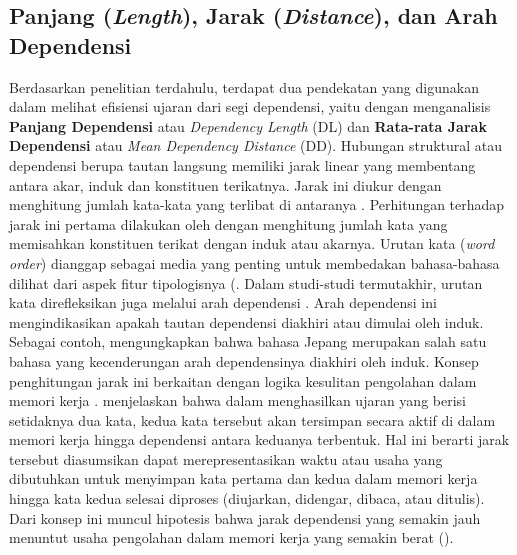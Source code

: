 \subsection{Panjang (\textit{Length}), Jarak (\textit{Distance}), dan Arah Dependensi}

Berdasarkan penelitian terdahulu, terdapat dua pendekatan yang digunakan dalam melihat efisiensi ujaran dari segi dependensi, yaitu dengan menganalisis \textbf{Panjang Dependensi} atau \textit{Dependency Length} (DL) dan \textbf{Rata-rata Jarak Dependensi} atau \textit{Mean Dependency Distance} (DD).  Hubungan struktural atau dependensi berupa tautan langsung memiliki jarak linear yang membentang antara akar, induk dan konstituen terikatnya. Jarak ini diukur dengan menghitung jumlah kata-kata yang terlibat di antaranya \citep{heringer1980syntax}. Perhitungan terhadap jarak ini pertama dilakukan oleh \cite{heringer1980syntax} dengan menghitung jumlah kata yang memisahkan konstituen terikat dengan induk atau akarnya. Urutan kata (\textit{word order}) dianggap sebagai media yang penting untuk membedakan bahasa-bahasa dilihat dari aspek fitur tipologisnya (\citealp{greenberg1963some, dryer1992greenbergian}. Dalam studi-studi termutakhir, urutan kata direfleksikan juga melalui arah dependensi \citep{hudson2007language}. Arah dependensi ini mengindikasikan apakah tautan dependensi diakhiri atau dimulai oleh induk. Sebagai contoh, \cite{hudson2003psychological} mengungkapkan bahwa bahasa Jepang merupakan salah satu bahasa yang kecenderungan arah dependensinya diakhiri oleh induk. Konsep penghitungan jarak ini berkaitan dengan logika kesulitan pengolahan dalam memori kerja \citep{hudson2007language}. \cite{hudson2007language} menjelaskan bahwa dalam menghasilkan ujaran yang berisi setidaknya dua kata, kedua kata tersebut akan tersimpan secara aktif di dalam memori kerja hingga dependensi antara keduanya terbentuk. Hal ini berarti jarak tersebut diasumsikan dapat merepresentasikan waktu atau usaha yang dibutuhkan untuk menyimpan kata pertama dan kedua dalam memori kerja hingga kata kedua selesai diproses (diujarkan, didengar, dibaca, atau ditulis). Dari konsep ini muncul hipotesis bahwa jarak dependensi yang semakin jauh menuntut usaha pengolahan dalam memori kerja yang semakin berat (\citealp{hudson2007language, gibson1998linguistic}).

